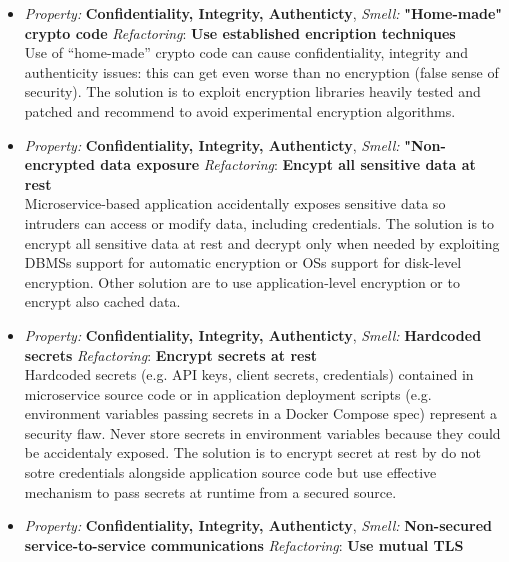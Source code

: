 \documentclass[10pt,a4paper]{report}
\begin{document}
\begin{itemize}
	 \item \textit{Property: } \textbf{Confidentiality, Integrity, Authenticty}, \textit{Smell:} \textbf{"Home-made" crypto code} \textit{Refactoring}: \textbf{Use established encription techniques} \\
	 
	 Use of “home-made” crypto code can cause confidentiality, integrity and authenticity issues: this can get even worse than no encryption (false sense of security). The solution is to exploit encryption libraries heavily tested and patched and recommend to avoid experimental encryption algorithms.
	 
	 
	  \item \textit{Property: } \textbf{Confidentiality, Integrity, Authenticty}, \textit{Smell:} \textbf{"Non-encrypted data exposure} \textit{Refactoring}: \textbf{Encypt all sensitive data at rest} \\
	 
	 Microservice-based application accidentally exposes sensitive data so intruders can access or modify data, including credentials. The solution is to encrypt all sensitive data at rest and decrypt only when needed by exploiting DBMSs support for automatic encryption or OSs support for disk-level encryption. Other solution are to use application-level encryption or to encrypt also cached data. 
	 
	 \item \textit{Property: } \textbf{Confidentiality, Integrity, Authenticty}, \textit{Smell:} \textbf{Hardcoded secrets} \textit{Refactoring}: \textbf{Encrypt secrets at rest} \\
	 
	 Hardcoded secrets (e.g. API keys, client secrets, credentials) contained in microservice source code or in application deployment scripts (e.g. environment variables passing secrets in a Docker Compose spec) represent a security flaw. 	 Never store secrets in environment variables because they could be accidentaly exposed. The solution is to encrypt secret at rest by do not sotre credentials alongside application source code but use effective mechanism to pass secrets at runtime from a secured source.
	 
	 
	 \item \textit{Property: } \textbf{Confidentiality, Integrity, Authenticty}, \textit{Smell:} \textbf{Non-secured service-to-service 	communications} \textit{Refactoring}: \textbf{Use mutual TLS} \\
	 

\end{itemize}
\end{document}
